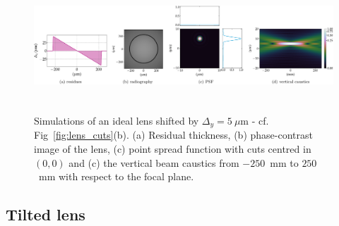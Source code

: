 \begin{refsection}
\begin{figure}[t]
        \centering
        {\includegraphics[height=4.19cm]{figures/compressed/shifted_CRL.pdf}}
        \caption[Effects of a transverse CRL offset]{Simulations of an ideal lens shifted by $\Delta_y=5~\mu$m - cf. Fig~\ref{fig:lens_cuts}(b). (a) Residual thickness, (b) phase-contrast image of the lens, (c) point spread function with cuts centred in $(0,0)$ and (c) the vertical beam caustics from $-250$~mm to $250$~mm with respect to the focal plane.} \label{fig:shifted_CRL}
\end{figure}

\subsection{Tilted lens}\label{sec:tilted_lens}


\end{refsection}
